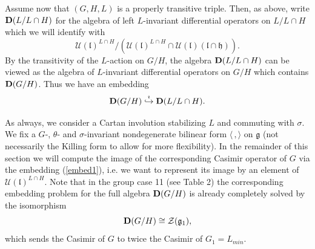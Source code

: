 \documentclass[10]{amsart}
\theoremstyle{remark}
\theoremstyle{definition}
\numberwithin{equation}{section}
\newcommand{\fg}{{\mathfrak g}}
\newcommand{\fh}{{\mathfrak h}}
\newcommand{\fl}{{\mathfrak l}}
\newcommand{\Cal}{\mathcal}
\newcommand{\be}{\begin{equation}}
\newcommand{\IP}[2]{\langle#1\,, #2\rangle}     %
\begin{document}
{Assume now that $(G,H,L)$ is a properly transitive triple. Then, as above, write ${\bf D}(L/L\cap H)$ for the algebra of left $L$-invariant differential operators on $L/L\cap H$ which we will
identify with 
$${\mathcal U}(\fl)^{L\cap H}/({\Cal U}(\fl)^{L\cap H}\cap {\Cal U}(\fl)(\fl\cap \fh)). $$
By the transitivity of the $L$-action on $G/H$, the algebra ${\bf D}(L/L\cap H)$ can be viewed as the algebra of $L$-invariant  differential operators on $G/H$ which contains ${\bf D}(G/H)$. Thus we have an embedding
%
\begin{equation}\label{embed1}
{\bf D}(G/H)\stackrel{\imath}\hookrightarrow {\bf D}(L/L\cap H).
\end{equation}
%

As always, we consider a Cartan involution stabilizing $L$ and commuting with $\sigma$. We fix a $G$-, $\theta$- and $\sigma$-invariant nondegenerate bilinear form $\IP{}{}$ on $\fg$ (not necessarily the Killing form to allow for more flexibility). In the remainder of this section we will compute the image of the corresponding Casimir operator of $G$ via the embedding (\ref{embed1}), i.e. we want to represent its image by an element of  ${\mathcal U}(\fl)^{L\cap H}$. Note that in the group case 11 (see Table 2) the corresponding embedding problem for the full algebra ${\bf D}(G/H)$  is already completely solved by the isomorphism 
\be\label{center}
{\bf D}(G/H)\cong {\Cal Z}(\fg_1),
\end{equation}
which sends the Casimir of $G$ to twice the Casimir of $G_1=L_{min}$.


}
\end{document}
